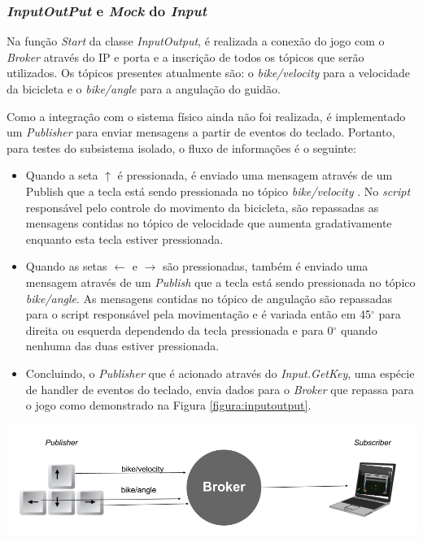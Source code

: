 \subsubsection{\textit{InputOutPut} e \textit{Mock} do \textit{Input}}

Na função \textit{Start} da classe  \textit{InputOutput}, é realizada a conexão do jogo com o \textit{Broker} através do IP e porta e a inscrição de todos os tópicos que serão utilizados. Os tópicos presentes atualmente são: o \textit{bike/velocity} para a velocidade da bicicleta e o \textit{bike/angle} para a angulação do guidão.

Como a integração com o sistema físico ainda não foi realizada, é implementado um \textit{Publisher} para enviar mensagens a partir de eventos do teclado. Portanto, para testes do subsistema isolado, o fluxo de informações é o seguinte:

\begin{itemize}
\item Quando a seta ${\uparrow}$ é pressionada, é enviado uma mensagem através de um Publish que a tecla está sendo pressionada no tópico \textit{bike/velocity} . No \textit{script} responsável pelo controle do movimento da bicicleta, são repassadas as mensagens contidas no tópico de velocidade que aumenta gradativamente enquanto esta tecla estiver pressionada.
\item Quando as setas ${\leftarrow}$ e ${\rightarrow}$ são pressionadas, também é enviado uma mensagem através de um \textit{Publish} que a tecla está sendo pressionada no tópico \textit{bike/angle}. As mensagens contidas no tópico de angulação são repassadas para o script responsável pela movimentação e é variada então em 45$^{\circ}$  para direita ou esquerda dependendo da tecla pressionada e para 0$^{\circ}$  quando nenhuma das duas estiver pressionada.
\item Concluindo, o \textit{Publisher} que é acionado através do \textit{Input.GetKey}, uma espécie de handler de eventos do teclado,  envia dados para o \textit{Broker} que repassa para o jogo como demonstrado na Figura \ref{figura:inputoutput}.
\end{itemize}

\begin{center}
	\includegraphics[scale=0.4]{figuras/inputoutp}
	\label{figura:inputoutput}
\end{center}

